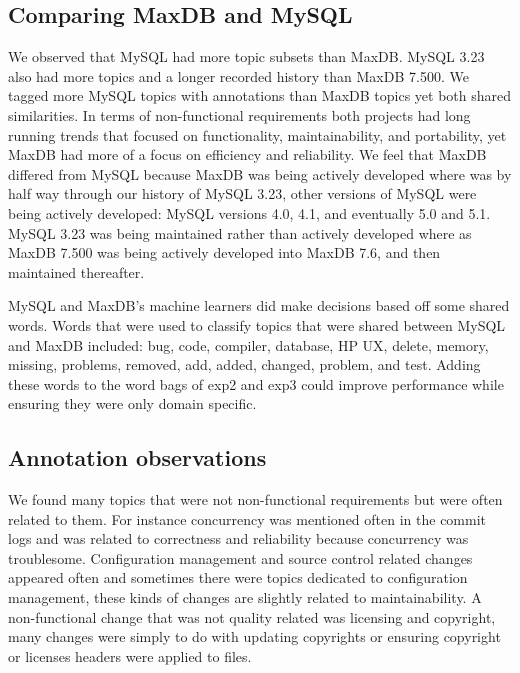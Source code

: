 \documentclass{acm_proc_article-sp}
\newcommand{\XXX}[1]{\textcolor{red}{{\it \textbf{[XXX: #1]}}}}
\begin{document}
\subsection{Comparing MaxDB and MySQL}


We observed that MySQL had more topic subsets than MaxDB. MySQL 3.23 also had more topics and a longer recorded history than MaxDB 7.500. We tagged more MySQL topics with annotations than MaxDB topics yet both shared similarities. In terms of non-functional requirements both projects had long running trends that focused on functionality, maintainability, and portability, yet MaxDB had more of a focus on efficiency and reliability. We feel that MaxDB differed from MySQL because MaxDB was being actively developed where was by half way through our history of MySQL 3.23, other versions of MySQL were being actively developed: MySQL versions 4.0, 4.1, and eventually 5.0 and 5.1. MySQL 3.23 was being maintained rather than actively developed where as MaxDB 7.500 was being actively developed into MaxDB 7.6, and then maintained thereafter.

MySQL and MaxDB's machine learners did make decisions based off some shared words. Words that were used to classify topics that were shared between MySQL and MaxDB included: bug, code, compiler, database, HP UX, delete, memory, missing, problems, removed, add, added, changed, problem, and test. Adding these words to the word bags of \textsf{exp2} and \textsf{exp3} could improve performance while ensuring they were only domain specific.

\subsection{Annotation observations}

We found many topics that were not non-functional requirements but were often related to them. For instance concurrency was mentioned often in the commit logs and was related to correctness and reliability because concurrency was troublesome. Configuration management and source control related changes appeared often and sometimes there were topics dedicated to configuration management, these kinds of changes are slightly related to maintainability. A non-functional change that was not quality related was licensing and copyright, many changes were simply to do with updating copyrights or ensuring copyright or licenses headers were applied to files.
\end{document}
